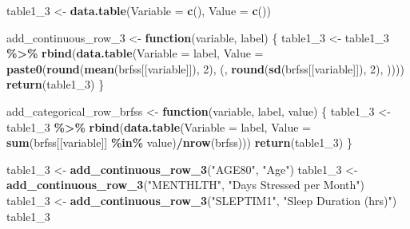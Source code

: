 \documentclass[
]{article}
\newenvironment{Shaded}{\begin{snugshade}}{\end{snugshade}}
\newcommand{\ControlFlowTok}[1]{\textcolor[rgb]{0.13,0.29,0.53}{\textbf{#1}}}
\newcommand{\DecValTok}[1]{\textcolor[rgb]{0.00,0.00,0.81}{#1}}
\newcommand{\FunctionTok}[1]{\textcolor[rgb]{0.13,0.29,0.53}{\textbf{#1}}}
\newcommand{\NormalTok}[1]{#1}
\newcommand{\OtherTok}[1]{\textcolor[rgb]{0.56,0.35,0.01}{#1}}
\newcommand{\SpecialCharTok}[1]{\textcolor[rgb]{0.81,0.36,0.00}{\textbf{#1}}}
\newcommand{\StringTok}[1]{\textcolor[rgb]{0.31,0.60,0.02}{#1}}
\begin{document}
\begin{Shaded}
\begin{Highlighting}[]
\NormalTok{table1\_3 }\OtherTok{\textless{}{-}} \FunctionTok{data.table}\NormalTok{(}\StringTok{\textquotesingle{}Variable\textquotesingle{}} \OtherTok{=} \FunctionTok{c}\NormalTok{(), }\StringTok{\textquotesingle{}Value\textquotesingle{}} \OtherTok{=} \FunctionTok{c}\NormalTok{())}

\NormalTok{add\_continuous\_row\_3 }\OtherTok{\textless{}{-}} \ControlFlowTok{function}\NormalTok{(variable, label) \{}
\NormalTok{  table1\_3 }\OtherTok{\textless{}{-}}\NormalTok{ table1\_3 }\SpecialCharTok{\%\textgreater{}\%} \FunctionTok{rbind}\NormalTok{(}\FunctionTok{data.table}\NormalTok{(}\StringTok{\textquotesingle{}Variable\textquotesingle{}} \OtherTok{=}\NormalTok{ label, }
                                        \StringTok{\textquotesingle{}Value\textquotesingle{}} \OtherTok{=} \FunctionTok{paste0}\NormalTok{(}\FunctionTok{round}\NormalTok{(}\FunctionTok{mean}\NormalTok{(brfss[[variable]]), }\DecValTok{2}\NormalTok{), }\StringTok{\textquotesingle{} (\textquotesingle{}}\NormalTok{, }\FunctionTok{round}\NormalTok{(}\FunctionTok{sd}\NormalTok{(brfss[[variable]]), }\DecValTok{2}\NormalTok{), }\StringTok{\textquotesingle{})\textquotesingle{}}\NormalTok{)))}
  \FunctionTok{return}\NormalTok{(table1\_3)}
\NormalTok{\}}

\NormalTok{add\_categorical\_row\_brfss }\OtherTok{\textless{}{-}} \ControlFlowTok{function}\NormalTok{(variable, label, value) \{}
\NormalTok{  table1\_3 }\OtherTok{\textless{}{-}}\NormalTok{ table1\_3 }\SpecialCharTok{\%\textgreater{}\%} \FunctionTok{rbind}\NormalTok{(}\FunctionTok{data.table}\NormalTok{(}\StringTok{\textquotesingle{}Variable\textquotesingle{}} \OtherTok{=}\NormalTok{ label,}
                                        \StringTok{\textquotesingle{}Value\textquotesingle{}} \OtherTok{=} \FunctionTok{sum}\NormalTok{(brfss[[variable]] }\SpecialCharTok{\%in\%}\NormalTok{ value)}\SpecialCharTok{/}\FunctionTok{nrow}\NormalTok{(brfss)))}
  \FunctionTok{return}\NormalTok{(table1\_3)}
\NormalTok{\}}

\NormalTok{table1\_3 }\OtherTok{\textless{}{-}} \FunctionTok{add\_continuous\_row\_3}\NormalTok{(}\StringTok{"AGE80"}\NormalTok{, }\StringTok{"Age"}\NormalTok{)}
\NormalTok{table1\_3 }\OtherTok{\textless{}{-}} \FunctionTok{add\_continuous\_row\_3}\NormalTok{(}\StringTok{"MENTHLTH"}\NormalTok{, }\StringTok{"Days Stressed per Month"}\NormalTok{)}
\NormalTok{table1\_3 }\OtherTok{\textless{}{-}} \FunctionTok{add\_continuous\_row\_3}\NormalTok{(}\StringTok{"SLEPTIM1"}\NormalTok{, }\StringTok{"Sleep Duration (hrs)"}\NormalTok{)}
\NormalTok{table1\_3}
\end{Highlighting}
\end{Shaded}
\end{document}
